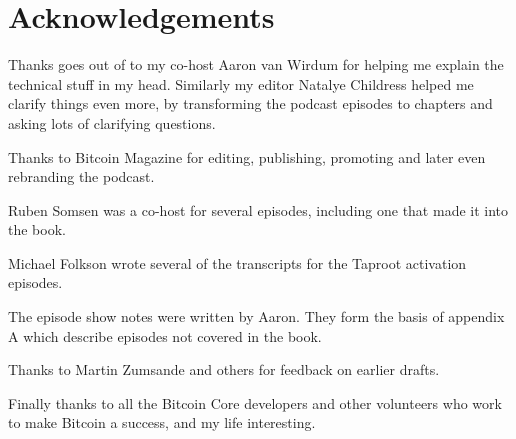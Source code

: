 \chapter{Acknowledgements}

Thanks goes out of to my co-host Aaron van Wirdum for helping me explain the technical stuff in my head. Similarly my editor Natalye Childress helped me clarify things even more, by transforming the podcast episodes to chapters and asking lots of clarifying questions.

Thanks to Bitcoin Magazine for editing, publishing, promoting and later even rebranding the podcast.

Ruben Somsen was a co-host for several episodes, including one that made it into the book.

Michael Folkson wrote several of the transcripts for the Taproot activation episodes.

The episode show notes were written by Aaron. They form the basis of appendix A which describe episodes not covered in the book.

Thanks to Martin Zumsande and others for feedback on earlier drafts.

Finally thanks to all the Bitcoin Core developers and other volunteers who work to make Bitcoin a success, and my life interesting.

\newpage

\ %

\newpage
